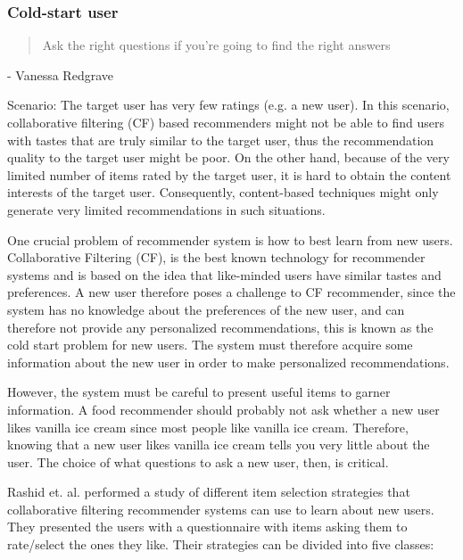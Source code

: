 

\subsubsection{Cold-start user}

\begin{quotation}
Ask the right questions if you're going to find the right answers
\end{quotation}
- Vanessa Redgrave

Scenario: The target user has very few ratings (e.g. a new user). In this scenario, collaborative filtering (CF) based recommenders might not be able to find users with tastes that are truly similar to the target user, thus the recommendation quality to the target user might be poor. On the other hand, because of the very limited number of items rated by the target user, it is hard to obtain the content interests of the target user. Consequently, content-based techniques might only generate very limited recommendations in such situations.

One crucial problem of recommender system is how to best learn from new users. Collaborative Filtering (CF), is the best known technology for recommender systems and is based on the idea that like-minded users have similar tastes and preferences. A new user therefore poses a challenge to CF recommender, since the system has no knowledge about the preferences of the new user, and can therefore not provide any personalized recommendations, this is known as the cold start problem for new users. The system must therefore acquire some information about the new user in order to make personalized recommendations.

However, the system must be careful to present useful items to garner information. A food recommender should probably not ask whether a new user likes vanilla ice cream since most people like vanilla ice cream. Therefore, knowing that a new user likes vanilla ice cream tells you very little about the user. The choice of what questions to ask a new user, then, is critical.

Rashid et. al. \cite{Rashid2002} performed a study of different item selection strategies that collaborative filtering recommender systems can use to learn about new users. They presented the users with a questionnaire with items asking them to rate/select the ones they like. Their strategies can be divided into five classes:

